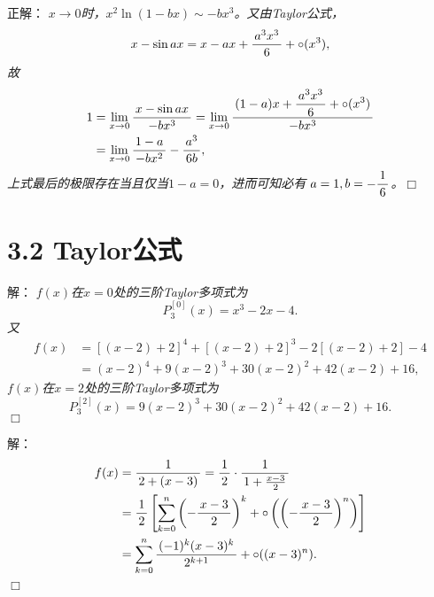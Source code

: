 \begin{frame}
	\linespread{1.5}
	\pause
	
	\bigskip
	
	\small 正解：\it 
	$x\to 0$时，$x^2\ln(1-bx)\sim-bx^3$。又由Taylor公式，
	$$x-\sin ax=x-ax+\displaystyle\frac{\,{a^3x^3}\,}{\,{6}\,}+\circ(x^3),$$
	故
	\begin{align*}
		1&=\lim\limits_{x\to{0}}\displaystyle\frac{\,{x-\sin ax}\,}{\,{-bx^3}\,}
		=\lim\limits_{x\to{0}}\displaystyle\frac{\,{(1-a)x+\displaystyle\frac{\,{a^3x^3}\,}{\,{6}\,}+\circ(x^3)}\,}{\,{-bx^3}\,}\\
		&=\lim\limits_{x\to{0}}\displaystyle\frac{\,{1-a}\,}{\,{-bx^2}\,}-\displaystyle\frac{\,{a^3}\,}{\,{6b}\,},
	\end{align*}
	上式最后的极限存在当且仅当$1-a=0$，进而可知必有
	$a=1,b=-\displaystyle\frac{\,{1}\,}{\,{6}\,}$。\hfill$\Box$
\end{frame}

\section{3.2 Taylor公式}

\begin{frame}
	\linespread{1.5}
	\pause

	\bigskip
	
	\small 解： \it 
	$f(x)$在$x=0$处的三阶Taylor多项式为
	$$P^{[0]}_3(x)=x^3-2x-4.$$
	\pause 又
	\begin{align*}
		f(x)&=[(x-2)+2]^4+[(x-2)+2]^3-2[(x-2)+2]-4\\
		&=(x-2)^4+9(x-2)^3+30(x-2)^2+42(x-2)+16,
	\end{align*}
	$f(x)$在$x=2$处的三阶Taylor多项式为
	$$P^{[2]}_3(x)=9(x-2)^3+30(x-2)^2+42(x-2)+16.$$
	\hfill$\Box$
\end{frame}

\begin{frame}
	\linespread{1.5}
	\pause
	
	\bigskip
	
	\small 解：\it
	\begin{align*}
		f(x)&=\displaystyle\frac{\,{1}\,}{\,{2+(x-3)}\,}=\displaystyle\frac{\,{1}\,}{\,{2}\,}\cdot\displaystyle\frac{\,{1}\,}{\,{1+\frac{x-3}2}\,}\\
		&=\displaystyle\frac{\,{1}\,}{\,{2}\,}\left[\sum\limits_{k=0}^n\left(-\displaystyle\frac{\,{x-3}\,}{\,{2}\,}\right)^k
		+\circ\left(\left(-\displaystyle\frac{\,{x-3}\,}{\,{2}\,}\right)^n\right)\right]\\
		&=\sum\limits_{k=0}^n\displaystyle\frac{\,{(-1)^k(x-3)^k}\,}{\,{2^{k+1}}\,}+\circ((x-3)^n).
	\end{align*}
	\hfill$\Box$
\end{frame}

